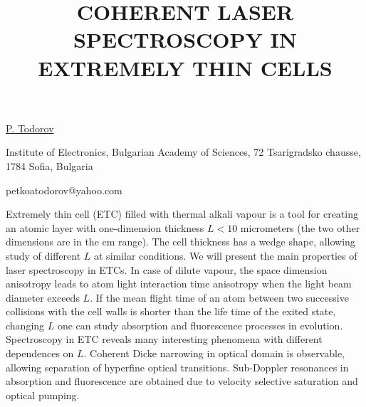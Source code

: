 \title{COHERENT LASER SPECTROSCOPY IN EXTREMELY THIN CELLS}

\underline{P. Todorov} 

{\normalsize{\vspace{-4mm}
Institute of Electronics, Bulgarian Academy of Sciences, 72
Tsarigradsko chausse, 1784 Sofia, Bulgaria

\email petkoatodorov@yahoo.com}}

Extremely thin cell (ETC) filled with thermal alkali vapour is a tool for creating an atomic layer with one-dimension thickness $L<10$ micrometers (the two other dimensions are in the cm range). The cell thickness has a wedge shape, allowing study of different $L$ at similar conditions.
We will present the main properties of laser spectroscopy in ETCs.
In case of dilute vapour, the space dimension anisotropy leads to atom light interaction time anisotropy when the light beam diameter exceeds $L$. If the mean flight time of an atom between two successive collisions with the cell walls is shorter than the life time of the exited state, changing $L$ one can study absorption and fluorescence processes in evolution.
Spectroscopy in ETC reveals many interesting phenomena with different dependences on $L$. Coherent Dicke narrowing in optical domain is observable, allowing separation of hyperfine optical transitions. Sub-Doppler resonances in absorption and fluorescence are obtained due to velocity selective saturation and optical pumping.

\vspace{\baselineskip}